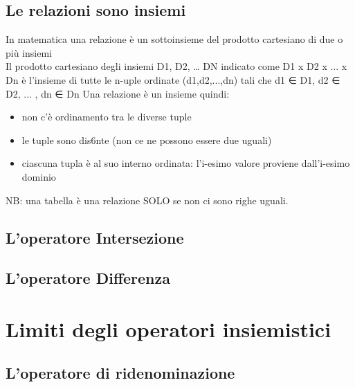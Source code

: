 \subsection{Le relazioni sono insiemi}
In matematica una relazione è un sottoinsieme del prodotto cartesiano di due o più insiemi
\\Il prodotto cartesiano degli insiemi D1, D2, … DN indicato come D1 x D2 x ... x Dn è l'insieme di tutte le n-uple ordinate (d1,d2,...,dn) tali che d1 ∈ D1, d2 ∈ D2, ... , dn ∈ Dn
Una relazione è un insieme quindi:
\begin{itemize}
    \item non c'è ordinamento tra le diverse tuple
    \item le tuple sono dis6nte (non ce ne possono essere due uguali)
    \item ciascuna tupla è al suo interno ordinata: l'i-esimo valore proviene dall'i-esimo dominio
\end{itemize}
NB: una tabella è una relazione SOLO se non ci sono righe uguali.
\subsection{L'operatore Intersezione}
\subsection{L'operatore Differenza}

\section{Limiti degli operatori insiemistici}
\subsection{L'operatore di ridenominazione}





